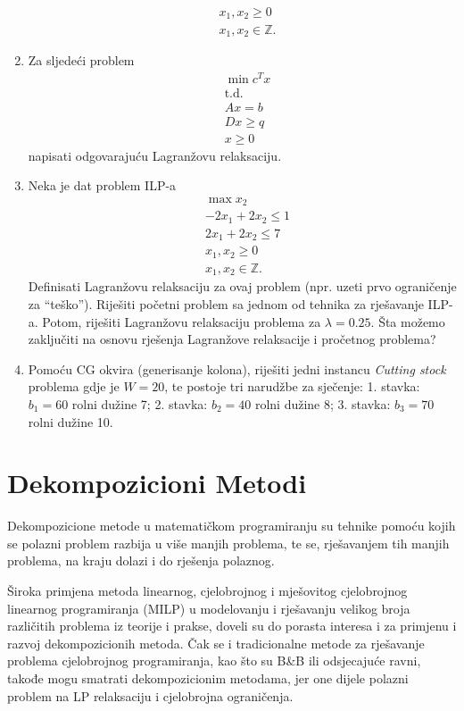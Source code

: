 \documentclass[a4paper, utf8, 11pt, colorlinks]{book}
\theoremstyle{definition}
\begin{document}
\begin{enumerate}
\begin{align*}
  	 & x_1, x_2 \geq 0 \\
  	 & x_1, x_2\in \mathbb{Z}.
  \end{align*}
\item  Za sljedeći problem 
\begin{align*}
	&\min c^T x \\
	&\mbox{t.d.}\\
	& Ax = b \\
	& D x \geq q \\
	& x \geq 0
\end{align*}
napisati odgovarajuću Lagranžovu relaksaciju. 
\item %
Neka je dat problem ILP-a
\begin{align*}
	&\max x_2 \\
	& -2x_1 + 2x_2 \leq 1 \\
	& 2 x_1 + 2 x_2 \leq 7 \\
	& x_1, x_2 \geq 0 \\
	& x_1, x_2 \in \mathbb{Z}.
\end{align*}
Definisati Lagranžovu relaksaciju za ovaj problem (npr. uzeti prvo ograničenje za ``teško''). Riješiti početni problem sa jednom od tehnika za rješavanje ILP-a. Potom, riješiti Lagranžovu relaksaciju problema za $\lambda=0.25$. Šta možemo zaključiti na osnovu rješenja Lagranžove relaksacije i pročetnog problema? 
\item   Pomoću CG okvira (generisanje kolona), riješiti jedni instancu \emph{Cutting stock} problema gdje je  
$W = 20$, te postoje tri narudžbe za sječenje: 1. stavka: $b_1=60$ rolni dužine 7; 2. stavka: $b_2=40$ rolni dužine 8; 3. stavka: $b_3=70$ rolni dužine 10. 

 \end{enumerate}
 
 
 \chapter{Dekompozicioni Metodi}
 
Dekompozicione metode u matematičkom programiranju su tehnike pomoću kojih se polazni problem  razbija u više manjih problema, te se, rješavanjem tih manjih problema, na kraju dolazi i do rješenja polaznog.

Široka primjena metoda linearnog, cjelobrojnog i mješovitog cjelobrojnog linearnog programiranja (MILP) u modelovanju i rješavanju velikog broja različitih problema iz teorije i prakse, doveli su do porasta interesa i za primjenu i razvoj dekompozicionih metoda. Čak se i tradicionalne metode za rješavanje problema cjelobrojnog programiranja, kao što su B\&B  ili odsjecajuće ravni, takođe   mogu smatrati dekompozicionim metodama, jer one dijele polazni problem na LP relaksaciju i cjelobrojna ograničenja.
\end{document}
